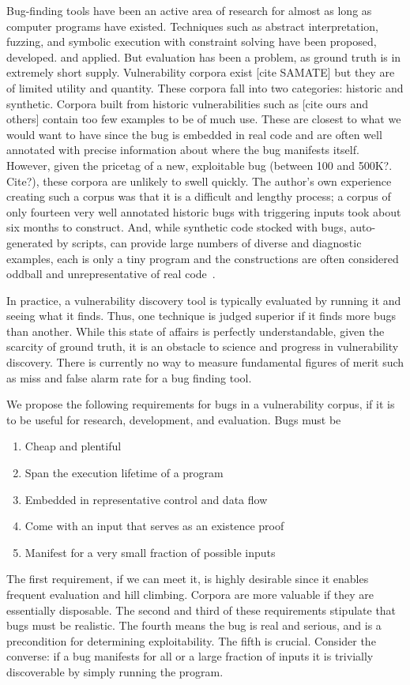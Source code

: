 \label{sec:motivation}

Bug-finding tools have been an active area of research for almost as long as computer programs have existed. 
Techniques such as abstract interpretation, fuzzing, and symbolic execution with constraint solving have been proposed, developed. and applied.
But evaluation has been a problem, as  ground truth is in extremely short supply.
Vulnerability corpora exist [cite SAMATE] but they are of limited utility and quantity.
These corpora fall into two categories: historic and synthetic.
Corpora built from historic vulnerabilities such as [cite ours and others] contain too few examples to be of much use.
These are closest to what we would want to have since the bug is embedded in real code and are often well annotated with precise information about where the bug manifests itself.
However, given the pricetag of a new, exploitable bug (between 100 and 500K?. Cite?), these corpora are unlikely to swell quickly.
The author's own experience creating such a corpus was that it is a difficult and lengthy process; a corpus of only fourteen very well annotated historic bugs with triggering inputs took about six months to construct. 
And, while synthetic code stocked with bugs, auto-generated by scripts, can provide large numbers of diverse and diagnostic examples, each is only a tiny program and the constructions are often considered oddball and unrepresentative of real code~\cite{kendra}.

In practice, a vulnerability discovery tool is typically evaluated by running it and seeing what it finds. 
Thus, one technique is judged superior if it finds more bugs than another.
While this state of affairs is perfectly understandable, given the scarcity of ground truth, it is an obstacle to science and progress in vulnerability discovery.
There is currently no way to measure fundamental figures of merit such as miss and false alarm rate for a bug finding tool.

We propose the following requirements for bugs in a vulnerability corpus, if it is to be useful for research, development, and evaluation.
Bugs must be
\begin{enumerate}
\item Cheap and plentiful
\item Span the execution lifetime of a program
\item Embedded in representative control and data flow
\item Come with an input that serves as an existence proof 
\item Manifest for a very small fraction of possible inputs
\end {enumerate}
The first requirement, if we can meet it, is highly desirable since it enables frequent evaluation and hill climbing. 
Corpora are more valuable if they are essentially disposable. 
The second and third of these requirements stipulate that bugs must be realistic.
The fourth means the bug is real and serious, and is a precondition for determining exploitability. 
The fifth is crucial.
Consider the converse: if a bug manifests for all or a large fraction of inputs it is trivially discoverable by simply running the program.

